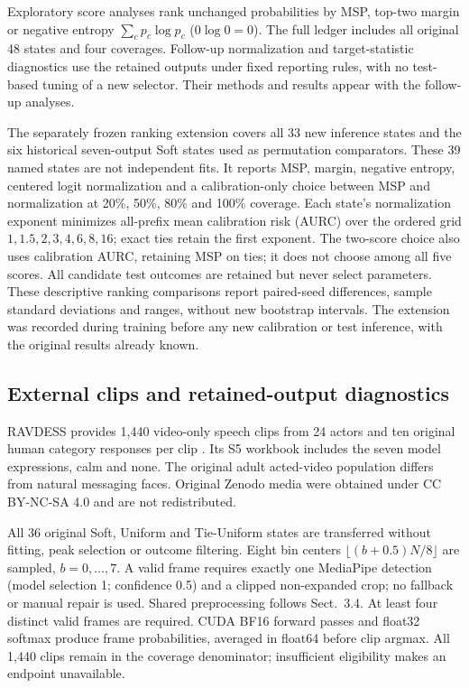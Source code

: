 Exploratory score analyses rank unchanged probabilities by MSP, top-two margin or negative entropy $\sum_cp_c\log p_c$ ($0\log0=0$). The full ledger includes all original 48 states and four coverages. Follow-up normalization and target-statistic diagnostics use the retained outputs under fixed reporting rules, with no test-based tuning of a new selector. Their methods and results appear with the follow-up analyses.

The separately frozen ranking extension covers all 33 new inference states and the six historical seven-output Soft states used as permutation comparators. These 39 named states are not independent fits. It reports MSP, margin, negative entropy, centered logit normalization and a calibration-only choice between MSP and normalization at 20\%, 50\%, 80\% and 100\% coverage. Each state's normalization exponent minimizes all-prefix mean calibration risk (AURC) over the ordered grid $1,1.5,2,3,4,6,8,16$; exact ties retain the first exponent. The two-score choice also uses calibration AURC, retaining MSP on ties; it does not choose among all five scores. All candidate test outcomes are retained but never select parameters. These descriptive ranking comparisons report paired-seed differences, sample standard deviations and ranges, without new bootstrap intervals. The extension was recorded during training before any new calibration or test inference, with the original results already known.

\subsection{External clips and retained-output diagnostics}\label{sec:external}
RAVDESS provides 1,440 video-only speech clips from 24 actors and ten original human category responses per clip \cite{livingstone2018ravdess}. Its S5 workbook includes the seven model expressions, calm and none. The original adult acted-video population differs from natural messaging faces. Original Zenodo media were obtained under CC BY-NC-SA 4.0 and are not redistributed.

All 36 original Soft, Uniform and Tie-Uniform states are transferred without fitting, peak selection or outcome filtering. Eight bin centers $\lfloor(b+0.5)N/8\rfloor$ are sampled, $b=0,\ldots,7$. A valid frame requires exactly one MediaPipe detection (model selection 1; confidence 0.5) and a clipped non-expanded crop; no fallback or manual repair is used. Shared preprocessing follows Sect.~3.4. At least four distinct valid frames are required. CUDA BF16 forward passes and float32 softmax produce frame probabilities, averaged in float64 before clip argmax. All 1,440 clips remain in the coverage denominator; insufficient eligibility makes an endpoint unavailable.

